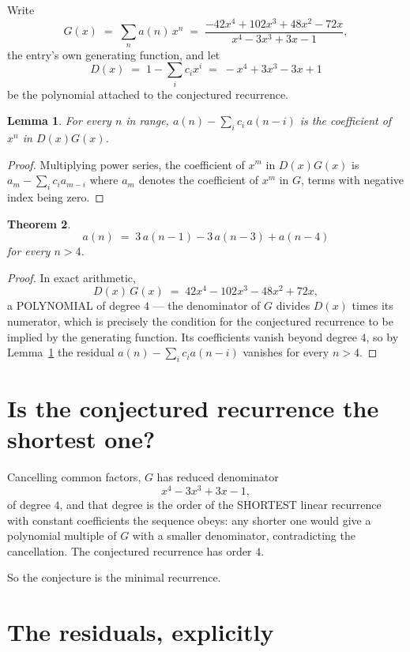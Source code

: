 \documentclass[11pt,a4paper]{article}
\theoremstyle{plain}
\newtheorem{theorem}{Theorem}
\newtheorem{lemma}[theorem]{Lemma}
\theoremstyle{definition}
\begin{document}
Write
\[
G(x)\;=\;\sum_{n}a(n)\,x^{n}\;=\;\frac{- 42 x^{4} + 102 x^{3} + 48 x^{2} - 72 x}{x^{4} - 3 x^{3} + 3 x - 1},
\]
the entry's own generating function, and let
\[
D(x)\;=\;1-\sum_i c_i x^{i}\;=\;- x^{4} + 3 x^{3} - 3 x + 1
\]
be the polynomial attached to the conjectured recurrence.

\begin{lemma}\label{lem:key}
For every $n$ in range, $a(n)-\sum_i c_i\,a(n-i)$ is the coefficient of $x^{n}$ in
$D(x)G(x)$.
\end{lemma}

\begin{proof}
Multiplying power series, the coefficient of $x^{m}$ in $D(x)G(x)$ is
$a_m-\sum_i c_i a_{m-i}$ where $a_m$ denotes the coefficient of $x^{m}$ in $G$, terms with
negative index being zero.
\end{proof}

\begin{theorem}
\[
a(n)\;=\;3\,a(n-1) - 3\,a(n-3) + a(n-4)
\]
for every $n>4$.
\end{theorem}

\begin{proof}
In exact arithmetic,
\[
D(x)\,G(x)\;=\;42 x^{4} - 102 x^{3} - 48 x^{2} + 72 x,
\]
a POLYNOMIAL of degree $4$ --- the denominator of $G$ divides $D(x)$ times its numerator,
which is precisely the condition for the conjectured recurrence to be implied by the
generating function. Its coefficients vanish beyond degree $4$, so by
Lemma~\ref{lem:key} the residual $a(n)-\sum_ic_ia(n-i)$ vanishes for every
$n>4$.
\end{proof}

\section{Is the conjectured recurrence the shortest one?}

Cancelling common factors, $G$ has reduced denominator
\[
x^{4} - 3 x^{3} + 3 x - 1,
\]
of degree $4$, and that degree is the order of the SHORTEST linear recurrence with
constant coefficients the sequence obeys: any shorter one would give a polynomial multiple of
$G$ with a smaller denominator, contradicting the cancellation. The conjectured recurrence has
order $4$.

So the conjecture is the minimal recurrence.

\section{The residuals, explicitly}
\end{document}
